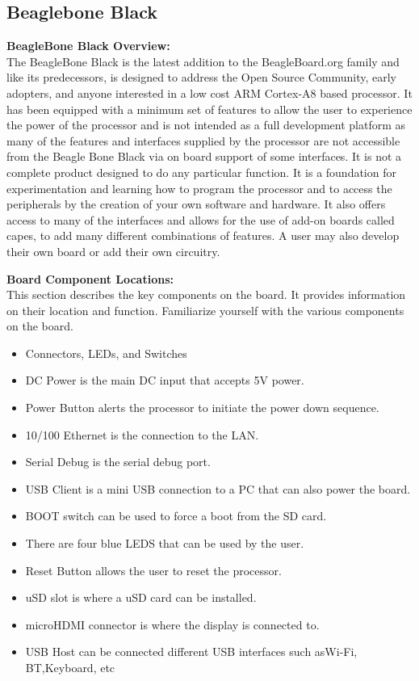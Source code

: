 \documentclass[a4paper,12pt]{article}
\begin{document}
\subsection{Beaglebone Black}
	\textbf{BeagleBone Black Overview:}\\ 
	The BeagleBone Black is the latest addition to the BeagleBoard.org family and like its predecessors, is designed to address the Open Source Community, early adopters, and anyone interested in a low cost ARM Cortex-A8 based processor. It has been equipped with a minimum set of features to allow the user to experience the power of the processor and is not intended as a full development platform as many of the features and interfaces supplied by the processor are not accessible from the Beagle Bone Black via on board support of some interfaces. It is not a complete product designed to do any particular function. It is a foundation for experimentation and learning how to program the processor and to access the peripherals by the creation of your own software and hardware. It also offers access to many of the interfaces and allows for the use of add-on boards called capes, to add many different combinations of features. A user may also develop their own board or add their own circuitry.
	
	\textbf{Board Component Locations:}\\ 
	This section describes the key components on the board. It provides information on their location and function. Familiarize yourself with the various components on the board. 
	\begin{itemize}
	\item Connectors, LEDs, and Switches 
	\item DC Power is the main DC input that accepts 5V power. 
	\item Power Button alerts the processor to initiate the power down sequence.  
	\item 10/100 Ethernet is the connection to the LAN. 
	\item Serial Debug is the serial debug port. 
	\item USB Client is a mini USB connection to a PC that can also power the board. 
	\item BOOT switch can be used to force a boot from the SD card. 
	\item There are four blue LEDS that can be used by the user. 
	\item Reset Button allows the user to reset the processor. 
	\item uSD slot is where a uSD card can be installed. 
	\item microHDMI connector is where the display is connected to. 
	\item USB Host can be connected different USB interfaces such asWi-Fi, BT,Keyboard, etc  	
	\end{itemize}
	
\end{document}
